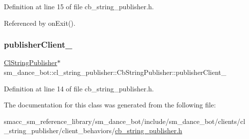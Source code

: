 Definition at line 15 of file cb\+\_\+string\+\_\+publisher.\+h.



Referenced by on\+Exit().

\mbox{\label{classsm__dance__bot_1_1cl__string__publisher_1_1CbStringPublisher_aafcad6e6296a3088cb91ffeb22025bd6}} 
\subsubsection{\texorpdfstring{publisher\+Client\+\_\+}{publisherClient\_}}
{\footnotesize\ttfamily \hyperlink{classsm__dance__bot_1_1cl__string__publisher_1_1ClStringPublisher}{Cl\+String\+Publisher}$\ast$ sm\+\_\+dance\+\_\+bot\+::cl\+\_\+string\+\_\+publisher\+::\+Cb\+String\+Publisher\+::publisher\+Client\+\_\+}



Definition at line 14 of file cb\+\_\+string\+\_\+publisher.\+h.



The documentation for this class was generated from the following file\+:\begin{DoxyCompactItemize}
\item 
smacc\+\_\+sm\+\_\+reference\+\_\+library/sm\+\_\+dance\+\_\+bot/include/sm\+\_\+dance\+\_\+bot/clients/cl\+\_\+string\+\_\+publisher/client\+\_\+behaviors/\hyperlink{sm__dance__bot_2include_2sm__dance__bot_2clients_2cl__string__publisher_2client__behaviors_2cb__string__publisher_8h}{cb\+\_\+string\+\_\+publisher.\+h}\end{DoxyCompactItemize}
